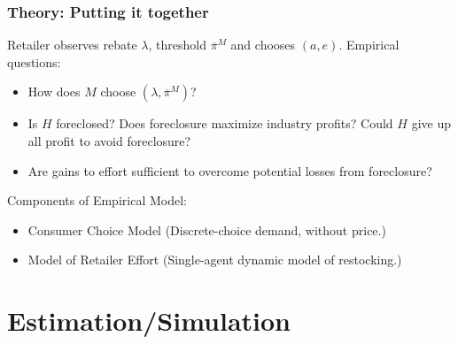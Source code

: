 \begin{frame}
\frametitle{Theory: Putting it together}
\small
Retailer observes rebate $\lambda$, threshold $\overline{\pi}^M$ and chooses $(a,e)$.
\vfill
Empirical questions:
\begin{itemize}
\item How does $M$ choose $(\lambda,\overline{\pi}^M)$?
\item Is $H$ foreclosed? Does foreclosure maximize industry profits? Could $H$ give up all profit to avoid foreclosure?
\item Are gains to effort sufficient to overcome potential losses from foreclosure?
\end{itemize}
Components of Empirical Model:
\begin{itemize}
\item Consumer Choice Model (Discrete-choice demand, without price.)
\item Model of Retailer Effort (Single-agent dynamic model of restocking.)
\end{itemize}
\end{frame}



\section{Estimation/Simulation}

